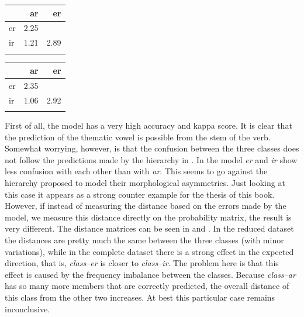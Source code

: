 \begin{minipage}{0.49\textwidth}
    \captionsetup{width=.8\linewidth}
    \centering
    \begin{tabular}{lrr}
      \lsptoprule
      & ar   & er   \\
      \midrule
      er & 2.25 &      \\
      ir & 1.21 & 2.89 \\
      \lspbottomrule
    \end{tabular}
    \label{tab:spanish-verbs-theme-dist}
\end{minipage}%
\begin{minipage}{0.49\textwidth}
    \captionsetup{width=.8\linewidth}
    \centering
    \begin{tabular}{lrr}
      \lsptoprule
      & ar       & er       \\
      \midrule
      er & 2.35&\\
      ir & 1.06& 2.92\\
      \lspbottomrule
    \end{tabular}
    \label{tab:spanish-verbs-theme-dist-2}
\end{minipage}

First of all, the model has a very high accuracy and kappa score. It is clear that the prediction of the thematic vowel is possible from the stem of the verb. Somewhat worrying, however, is that the confusion between the three classes does not follow the predictions made by the hierarchy in . In the model \textit{er} and \textit{ir} show less confusion with each other than with \textit{ar}. This seems to go against the hierarchy proposed to model their morphological asymmetries. Just looking at this case it appears as a strong counter example for the thesis of this book. 
However, if instead of measuring the distance based on the errors made by the model, we measure this distance directly on the probability matrix, the result is very different. The distance matrices can be seen in  and . In the reduced dataset the distances are pretty much the same between the three classes (with minor variations), while in the complete dataset there is a strong effect in the expected direction, that is, \textit{class--er} is closer to \textit{class--ir}. The problem here is that this effect is caused by the frequency imbalance between the classes. Because \textit{class--ar} has so many more members that are correctly predicted, the overall distance of this class from the other two increases. At best this particular case remains inconclusive.

